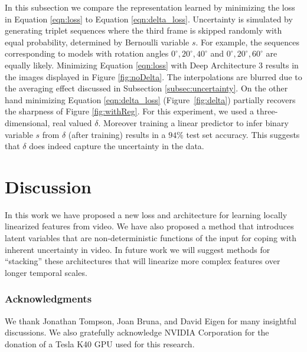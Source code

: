 \documentclass{article} %
\begin{document}
In this subsection we compare the representation learned by minimizing the loss in Equation \ref{eqn:loss} to Equation \ref{eqn:delta_loss}. Uncertainty is simulated by generating triplet sequences where the third frame is skipped randomly with equal probability, determined by Bernoulli variable $s$. For example, the sequences corresponding to models with rotation angles $0^{\circ}, 20^{\circ}, 40^{\circ}$ and $0^{\circ}, 20^{\circ}, 60^{\circ}$ are equally likely. Minimizing Equation \ref{eqn:loss} with Deep Architecture 3 results in the images displayed in Figure \ref{fig:noDelta}. The interpolations are blurred due to the averaging effect discussed in Subsection \ref{subsec:uncertainty}. On the other hand minimizing Equation \ref{eqn:delta_loss} (Figure~\ref{fig:delta}) partially recovers the sharpness of Figure \ref{fig:withReg}. For this experiment, we used a three-dimensional, real valued $\delta$. Moreover training a linear predictor to infer binary variable $s$ from $\delta$ (after training) results in a $94\%$ test set accuracy. This suggests that $\delta$ does indeed capture the uncertainty in the data.

\section{Discussion}
\label{sec:conclusion} 

In this work we have proposed a new loss and architecture for learning locally linearized features from video. We have also proposed a method that introduces latent variables that are  non-deterministic functions of the input for coping with inherent uncertainty in video. In future work we will suggest methods for ``stacking'' these architectures that will linearize more complex features over longer temporal scales.   

\subsubsection*{Acknowledgments}
We thank Jonathan Tompson, Joan Bruna, and David Eigen for many insightful discussions. We also gratefully acknowledge NVIDIA Corporation for the donation of a Tesla K40 GPU used for this research. 
{}

\end{document}
